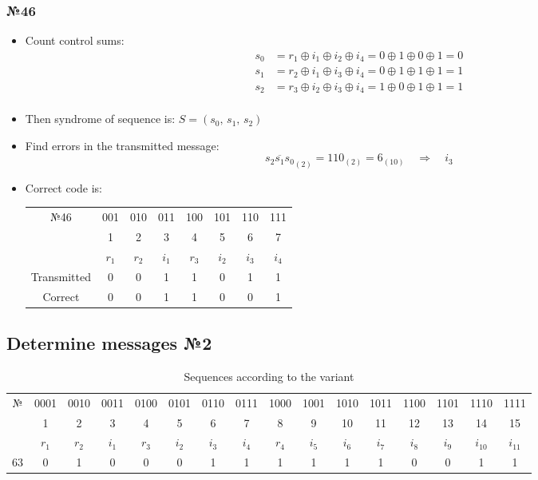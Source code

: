 \documentclass[12pt]{article}
\begin{document}
	\subsubsection{\Large №46}
	\begin{itemize}
		\item  Count control sums:
		\begin{align*}
			s_{0} &= r_{1}\oplus i_{1}\oplus i_{2}\oplus i_{4}=0\oplus1\oplus0\oplus1=0\\
			s_{1} &= r_{2}\oplus i_{1}\oplus i_{3}\oplus i_{4}=0\oplus1\oplus1\oplus1=1\\
			s_{2} &= r_{3}\oplus i_{2}\oplus i_{3}\oplus i_{4}=1\oplus0\oplus1\oplus1=1\\
		\end{align*}
		\item Then syndrome of sequence is: \(S = (s_{0},\,s_{1},\,s_{2})\)
		\item Find errors in the transmitted message: \[\overline{s_{2}s_{1}s_{0}}_{(2)} = 110_{(2)}=6_{(10)} \quad \Rightarrow \quad i_{3}\]
		\item Correct code is:
		\begin{table}[h!]
			\centering
			\begin{tabular}{ |c|c|c|c|c|c|c|c| } 
				\hline
				\multirow{3}{4em}{\centering№46} & 001 & 010 & 011 & 100 & 101 & 110 & 111 \\
				& 1 & 2 & 3 & 4 & 5 & 6 & 7 \\ 
				& \(r_{1}\) & \(r_{2}\) & \(i_{1}\) & \(r_{3}\) & \(i_{2}\) & \(i_{3}\) & \(i_{4}\) \\
				\hline 
				Transmitted & 0 & 0 & 1 & 1 & 0 & 1 & 1 \\ 
				\hline
				Correct & 0 & 0 & 1 & 1 & 0 & 0 & 1\\
				\hline
			\end{tabular}
		\end{table}
	\end{itemize}
	\subsection{\Large Determine messages №2}
	\begin{table}[h!]
		\hspace*{-3cm}
		\begin{tabular}{ |c|c|c|c|c|c|c|c|c|c|c|c|c|c|c|c| } 
			\hline
			\multirow{3}{4em}{\centering№} & 0001 & 0010 & 0011 & 0100 & 0101 & 0110 & 0111 & 1000 & 1001 & 1010 & 1011 & 1100 & 1101 & 1110 & 1111 \\
			& 1 & 2 & 3 & 4 & 5 & 6 & 7 & 8 & 9 & 10 & 11 & 12 & 13 & 14 & 15\\ 
			& \(r_{1}\) & \(r_{2}\) & \(i_{1}\) & \(r_{3}\) & \(i_{2}\) & \(i_{3}\) & \(i_{4}\) & \(r_{4}\) & \(i_{5}\) & \(i_{6}\) & \(i_{7}\) & \(i_{8}\) & \(i_{9}\) & \(i_{10}\) & \(i_{11}\)\\
			\hline 
			63 & 0 & 1 & 0 & 0 & 0 & 1 & 1 & 1 & 1 & 1 & 1 & 0 & 0 & 1 & 1\\ 
			\hline
		\end{tabular}
		\caption{Sequences according to the variant}
		\label{table2:data}
	\end{table}
\end{document}
